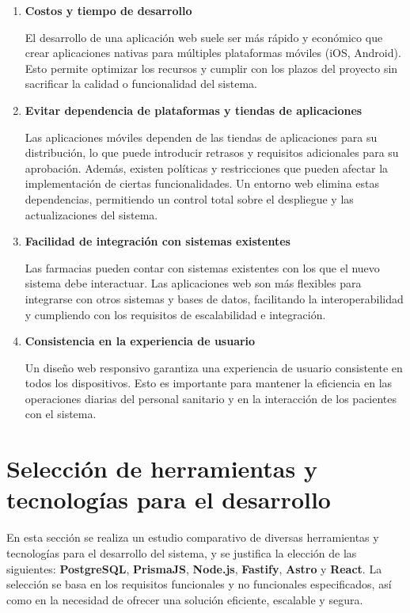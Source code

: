 \begin{enumerate}
	\item \textbf{Costos y tiempo de desarrollo}
	
	El desarrollo de una aplicación web suele ser más rápido y económico que crear aplicaciones nativas para múltiples plataformas móviles (iOS, Android). Esto permite optimizar los recursos y cumplir con los plazos del proyecto sin sacrificar la calidad o funcionalidad del sistema.
	
	\item \textbf{Evitar dependencia de plataformas y tiendas de aplicaciones}
	
	Las aplicaciones móviles dependen de las tiendas de aplicaciones para su distribución, lo que puede introducir retrasos y requisitos adicionales para su aprobación. Además, existen políticas y restricciones que pueden afectar la implementación de ciertas funcionalidades. Un entorno web elimina estas dependencias, permitiendo un control total sobre el despliegue y las actualizaciones del sistema.
	
	\item \textbf{Facilidad de integración con sistemas existentes}
	
	Las farmacias pueden contar con sistemas existentes con los que el nuevo sistema debe interactuar. Las aplicaciones web son más flexibles para integrarse con otros sistemas y bases de datos, facilitando la interoperabilidad y cumpliendo con los requisitos de escalabilidad e integración.
	
	\item \textbf{Consistencia en la experiencia de usuario}
	
	Un diseño web responsivo garantiza una experiencia de usuario consistente en todos los dispositivos. Esto es importante para mantener la eficiencia en las operaciones diarias del personal sanitario y en la interacción de los pacientes con el sistema.
	
\end{enumerate}

\section{Selección de herramientas y tecnologías para el desarrollo}

En esta sección se realiza un estudio comparativo de diversas herramientas y tecnologías para el desarrollo del sistema, y se justifica la elección de las siguientes: \textbf{PostgreSQL}, \textbf{PrismaJS}, \textbf{Node.js}, \textbf{Fastify}, \textbf{Astro} y \textbf{React}. La selección se basa en los requisitos funcionales y no funcionales especificados, así como en la necesidad de ofrecer una solución eficiente, escalable y segura.

